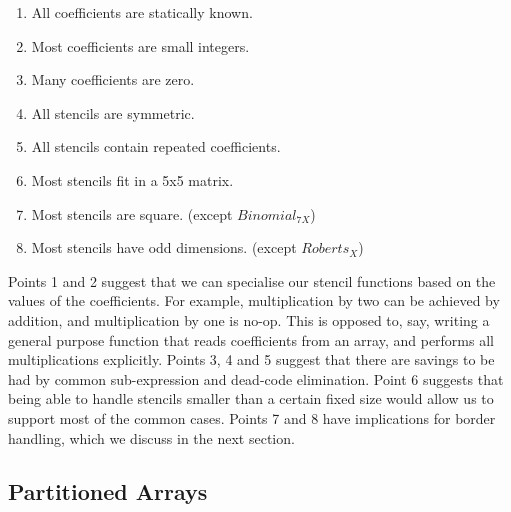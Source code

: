 \begin{enumerate}
\item	All coefficients are statically known.
\item	Most coefficients are small integers.
\item	Many coefficients are zero.
\item	All stencils are symmetric. 
\item	All stencils contain repeated coefficients.
\item	Most stencils fit in a 5x5 matrix.
\item	Most stencils are square. (except $Binomial_{7X}$)
\item	Most stencils have odd dimensions. (except $Roberts_X$)
\end{enumerate}

Points 1 and 2 suggest that we can specialise our stencil functions based on the values of the coefficients. For example, multiplication by two can be achieved by addition, and multiplication by one is no-op. This is opposed to, say, writing a general purpose function that reads coefficients from an array, and performs all multiplications explicitly. Points 3, 4 and 5 suggest that there are savings to be had by common sub-expression and dead-code elimination. Point 6 suggests that being able to handle stencils smaller than a certain fixed size would allow us to support most of the common cases. Points 7 and 8 have implications for border handling, which we discuss in the next section. 


\subsection{Partitioned Arrays}
\label{sec:PartitionedArrays}
\label{sec:BordersAndPartitionedArrays}


